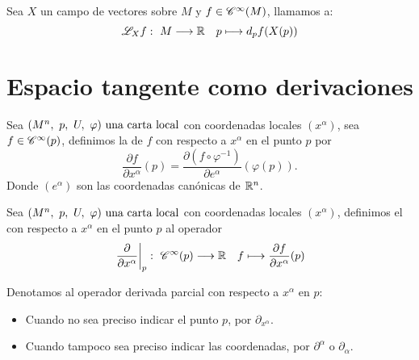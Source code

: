 \begin{definition}
  Sea $X$ un campo de vectores sobre $M$ y $f\in\mathscr{C}^\infty(M)$, llamamos  a:
  \begin{equation}
    \label{eq:derivada-lie-funcion-campo}
      \mathscr{L}_X f:\ M \longrightarrow \mathbb{R} \quad p \longmapsto d_p f(X(p))
  \end{equation}
\end{definition}


\section{Espacio tangente como derivaciones}\label{sec:espacio-tangente-como-derivaciones}
\begin{definition}
  Sea $(M^n,\ p,\ U,\ \varphi)\textmd{ una carta local}$ con coordenadas locales $(x^\alpha)$, sea $f\in\mathscr{C}^\infty(p)$, definimos la
   de $f$ con respecto a $x^\alpha$ en
  el punto $p$ por
  \begin{equation}
    \label{eq:parcial-funcion-punto}
    \frac{\partial f}{\partial x^\alpha}(p)=\frac{\partial (f\circ\varphi^{-1})}{\partial
    e^\alpha}(\varphi(p)).
  \end{equation}
  Donde $(e^\alpha)$ son las coordenadas canónicas de $\mathbb{R}^n$.
\end{definition}

\begin{definition}
  Sea $(M^n,\ p,\ U,\ \varphi)\textmd{ una carta local}$ con coordenadas locales $(x^\alpha)$, definimos el
   con
  respecto a $x^\alpha$ en
  el punto $p$ al operador
  \begin{equation}
    \label{eq:operador-parcial-funcion-punto}
      \left.\frac{\partial}{\partial x^\alpha}\right|_p:\ \mathscr{C}^\infty(p) \longrightarrow \mathbb{R} \quad f \longmapsto \frac{\partial f}{\partial x^\alpha}(p)
  \end{equation}
\end{definition}

\begin{notation}
  Denotamos al operador derivada parcial con respecto a $x^\alpha$ en $p$:
  \begin{itemize}
    \item Cuando no sea preciso indicar el punto $p$, por $\partial_{x^\alpha}$.
    \item Cuando tampoco sea preciso indicar las coordenadas, por $\partial^\alpha$ o $\partial_\alpha$.
  \end{itemize}
\end{notation}

